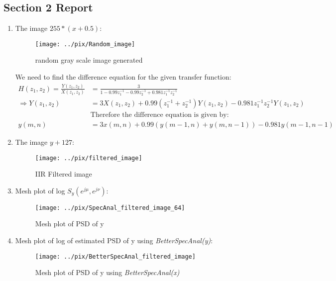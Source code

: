 \documentclass[a4paper,11pt]{article}
\begin{document}
\subsection*{Section 2 Report} 
\begin{enumerate}
\item The image $255*(x+0.5)$:
\begin{figure}[!hp]
 \centering
 \texttt{[image: ../pix/Random\_image]}
 \caption{random gray scale image generated}
\end{figure}

We need to find the difference equation for the given transfer function:
\begin{align*}
 H(z_1,z_2)= \frac{Y(z_1,z_2)}{X(z_1,z_2)}&= \frac{3}{1-0.99z_1^{-1} -0.99z_2^{-1}+0.981z_1^{-1}z_2^{-1}}\\
 \Rightarrow Y(z_1,z_2)&= 3X(z_1,z_2) + 0.99(z_1^{-1} + z_2^{-1}) Y(z_1,z_2)  -0.981 z_1^{-1}z_2^{-1} Y(z_1,z_2)\\
 &\text{Therefore the difference equation is given by:}\\
 y(m,n) &= 3x(m,n) + 0.99(y(m-1,n) + y(m,n-1)) -0.981y(m-1,n-1)
\end{align*}

\newpage
\item The image $y+127$:

\begin{figure}[!hp]
 \centering
 \texttt{[image: ../pix/filtered\_image]}
 \caption{IIR Filtered image}
\end{figure}


\newpage
\item  Mesh plot of log $S_y(e^{j\mu},e^{j\nu})$:
\begin{figure}[!hp]
 \centering
 \texttt{[image: ../pix/SpecAnal\_filtered\_image\_64]}
 \caption{Mesh plot of PSD of y}
\end{figure}

\newpage
\item Mesh plot of log of estimated PSD of y using \textit{BetterSpecAnal(y)}:
\begin{figure}[!hp]
 \centering
 \texttt{[image: ../pix/BetterSpecAnal\_filtered\_image]}
 \caption{Mesh plot of PSD of y using \textit{BetterSpecAnal(x)}}
\end{figure}

\end{enumerate}


\newpage
\end{document}
